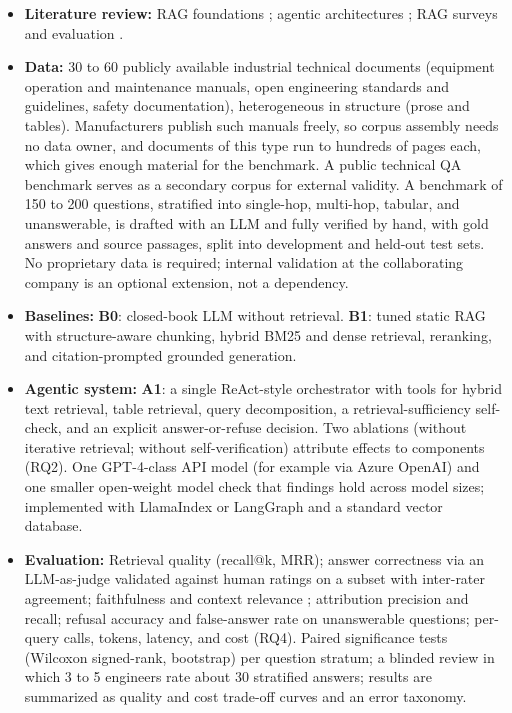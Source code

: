 \documentclass[10pt,a4paper]{article}
\begin{document}
\begin{itemize}
    \item \textbf{Literature review:} RAG foundations \cite{lewis2020rag}; agentic architectures \cite{yao2023react, singh2025agentic}; RAG surveys and evaluation \cite{gao2024survey, es2024ragas, ragindustry2025}.
    \item \textbf{Data:} 30 to 60 publicly available industrial technical documents (equipment operation and maintenance manuals, open engineering standards and guidelines, safety documentation), heterogeneous in structure (prose and tables). Manufacturers publish such manuals freely, so corpus assembly needs no data owner, and documents of this type run to hundreds of pages each, which gives enough material for the benchmark. A public technical QA benchmark serves as a secondary corpus for external validity. A benchmark of 150 to 200 questions, stratified into single-hop, multi-hop, tabular, and unanswerable, is drafted with an LLM and fully verified by hand, with gold answers and source passages, split into development and held-out test sets. No proprietary data is required; internal validation at the collaborating company is an optional extension, not a dependency.
    \item \textbf{Baselines:} \textbf{B0}: closed-book LLM without retrieval. \textbf{B1}: tuned static RAG with structure-aware chunking, hybrid BM25 and dense retrieval, reranking, and citation-prompted grounded generation.
    \item \textbf{Agentic system:} \textbf{A1}: a single ReAct-style orchestrator \cite{yao2023react} with tools for hybrid text retrieval, table retrieval, query decomposition, a retrieval-sufficiency self-check, and an explicit answer-or-refuse decision. Two ablations (without iterative retrieval; without self-verification) attribute effects to components (RQ2). One GPT-4-class API model (for example via Azure OpenAI) and one smaller open-weight model check that findings hold across model sizes; implemented with LlamaIndex or LangGraph and a standard vector database.
    \item \textbf{Evaluation:} Retrieval quality (recall@k, MRR); answer correctness via an LLM-as-judge validated against human ratings on a subset with inter-rater agreement; faithfulness and context relevance \cite{es2024ragas}; attribution precision and recall; refusal accuracy and false-answer rate on unanswerable questions; per-query calls, tokens, latency, and cost (RQ4). Paired significance tests (Wilcoxon signed-rank, bootstrap) per question stratum; a blinded review in which 3 to 5 engineers rate about 30 stratified answers; results are summarized as quality and cost trade-off curves and an error taxonomy.
\end{itemize}
\end{document}
